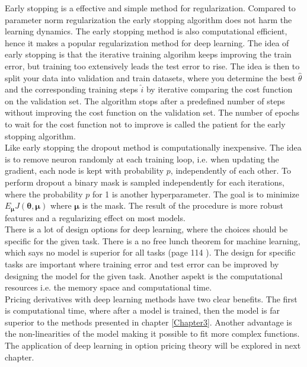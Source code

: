Early stopping is a effective and simple method for regularization. Compared to parameter norm regularization the early stopping algorithm does not harm the learning dynamics. The early stopping method is also computational efficient, hence it makes a popular regularization method for deep learning. The idea of early stopping is that the iterative training algorihm keeps improving the train error, but training too extensively leads the test error to rise. The idea is then to split your data into validation and train datasets, where you determine the best $\hat{\theta}$ and the corresponding training steps $\hat{i}$ by iterative comparing the cost function on the validation set. The algorithm stops after a predefined number of steps without improving the cost function on the validation set. The number of epochs to wait for the cost function not to improve is called the patient for the early stopping algorithm.\\

Like early stopping the dropout method is computationally inexpensive. The idea is to remove neuron randomly at each training loop, i.e. when updating the gradient, each node is kept with probability $p$, independently of each other. To perform dropout a binary mask is sampled independently for each iterations, where the probability $p$ for 1 is another hyperparameter. The goal is to minimize $E_{\bm{\mu}} J(\bm{\theta}, \bm{\mu})$ where $\bm{\mu}$ is the mask. The result of the procedure is more robust features and a regularizing effect on most models.\\

There is a lot of design options for deep learning, where the choices should be specific for the given task. There is a no free lunch theorem for machine learning, which says no model is superior for all tasks (page 114 \parencite{Goodfellow-et-al-2016}). The design for specific tasks are important where training error and test error can be improved by designing the model for the given task. Another aspekt is the computational resources i.e. the memory space and computational time. \\

Pricing derivatives with deep learning methods have two clear benefits. The first is computational time, where after a model is trained, then the model is far superior to the methods presented in chapter \ref{Chapter3}. Another advantage is the non-linearities of the model making it possible to fit more complex functions. The application of deep learning in option pricing theory will be explored in next chapter.
